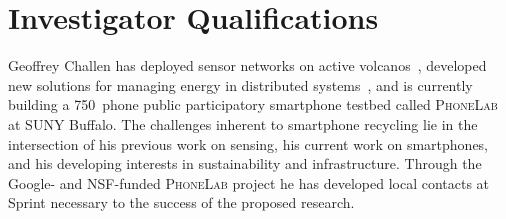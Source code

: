 \section{Investigator Qualifications}
\label{sec-qualifications}

Geoffrey Challen has deployed sensor networks on active
volcanos~\cite{volcano-osdi06}, developed new solutions for managing energy
in distributed systems~\cite{lance-sensys08,idea-mobisys10}, and is currently
building a 750~phone public participatory smartphone testbed called
\textsc{PhoneLab} at SUNY Buffalo. The challenges inherent to smartphone
recycling lie in the intersection of his previous work on sensing, his
current work on smartphones, and his developing interests in sustainability
and infrastructure. Through the Google- and NSF-funded \textsc{PhoneLab}
project he has developed local contacts at Sprint necessary to the success of
the proposed research.
